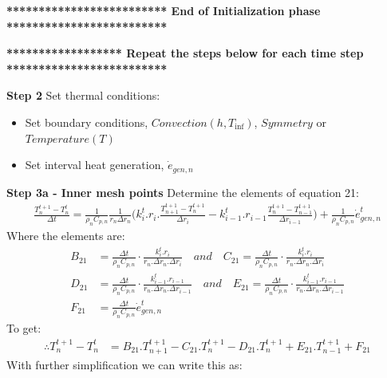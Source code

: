 \documentclass[11pt,letterpaper,titlepage]{article}
\begin{document}
\vspace{0.5cm}\noindent
\textbf{************************* End of Initialization phase *************************}\newline

\vspace{0.5cm}\noindent
\textbf{****************** Repeat the steps below for each time step *************************}\newline


\vspace{0.5cm}\noindent
\textbf{Step 2}\newline
Set thermal conditions:
\begin{itemize}
\item Set boundary conditions, $Convection(h,T_{\inf})$, $Symmetry$ or $Temperature(T)$
\item Set interval heat generation, $\dot{e}_{gen,n}$
\end{itemize}




\vspace{0.5cm}\noindent
\textbf{Step 3a - Inner mesh points}\newline
Determine the elements of equation 21:
\begin{equation*}
\begin{aligned}
\frac{T_n^{t+1}-T_n^t}{\Delta t} = \frac{1}{\rho_n C_{p,n}} \frac{1}{r_n\Delta r_n} \biggr(  k_i^t.r_i. \frac{T_{n+1}^{t+1} - T_{n}^{t+1}}{\Delta r_i}  - k_{i-1}^t.r_{i-1} \frac{T_{n}^{t+1} - T_{n-1}^{t+1}}{\Delta r_{i-1}} \biggr) + \frac{1}{\rho_n C_{p,n}} \dot{e}_{gen,n}^t
\end{aligned}
\end{equation*}
\newline
Where the elements are:
\begin{equation*}
\begin{aligned}
B_{21}&=\frac{\Delta t}{\rho_n C_{p,n}} \cdot \frac{k_i^t.r_i        }{r_n.\Delta r_n.\Delta r_i}
 \quad and \quad
C_{21} =\frac{\Delta t}{\rho_n C_{p,n}} \cdot \frac{k_i^t.r_i        }{r_n.\Delta r_n.\Delta r_i} \\
D_{21}&=\frac{\Delta t}{\rho_n C_{p,n}} \cdot \frac{k_{i-1}^t.r_{i-1}}{r_n.\Delta r_n.\Delta r_{i-1}}
 \quad and \quad
E_{21}=\frac{\Delta t}{\rho_n C_{p,n}} \cdot \frac{k_{i-1}^t.r_{i-1}}{r_n.\Delta r_n.\Delta r_{i-1}}\\ 
F_{21}&=\frac{\Delta t}{\rho_n C_{p,n}} \dot{e}_{gen,n}^t
\end{aligned}
\end{equation*}
\newline
To get:
\begin{equation*}
\begin{aligned}
\therefore T_n^{t+1}-T_n^t&= B_{21}.T_{n+1}^{t+1} - C_{21}.T_{n}^{t+1}    
			    - D_{21}.T_{n}^{t+1} + E_{21}.T_{n-1}^{t+1}   
			    + F_{21}        
\end{aligned}
\end{equation*}
With further simplification we can write this as:
\end{document}
